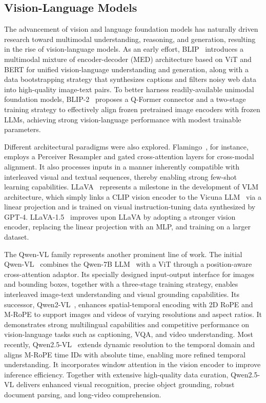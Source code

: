 \documentclass[10pt, a4paper, logo, copyright]{googledeepmind} %
\begin{document}
\subsection{Vision-Language Models}
\label{sec:vlms}

The advancement of vision and language foundation models has naturally driven research toward multimodal understanding, reasoning, and generation, resulting in the rise of vision-language models. As an early effort, BLIP~\cite{li2022blip} introduces a multimodal mixture of encoder-decoder (MED) architecture based on ViT and BERT for unified vision-language understanding and generation, along with a data bootstrapping strategy that synthesizes captions and filters noisy web data into high-quality image-text pairs. To better harness readily-available unimodal foundation models, BLIP-2~\cite{li2023blip} proposes a Q-Former connector and a two-stage training strategy to effectively align frozen pretrained image encoders with frozen LLMs, achieving strong vision-language performance with modest trainable parameters.

Different architectural paradigms were also explored. Flamingo~\cite{alayrac2022flamingo}, for instance, employs a Perceiver Resampler and gated cross-attention layers for cross-modal alignment. It also processes inputs in a manner inherently compatible with interleaved visual and textual sequences, thereby enabling strong few-shot learning capabilities. LLaVA~\cite{liu2023visual} represents a milestone in the development of VLM architecture, which simply links a CLIP vision encoder to the Vicuna LLM~\cite{chiang2023vicuna} via a linear projection and is trained on visual instruction-tuning data synthesized by GPT-4. LLaVA-1.5~\cite{liu2024improved} improves upon LLaVA by adopting a stronger vision encoder, replacing the linear projection with an MLP, and training on a larger dataset.

The Qwen-VL family represents another prominent line of work. The initial Qwen-VL~\cite{bai2023qwenvlversatilevisionlanguagemodel} combines the Qwen-7B LLM~\cite{qwen} with a ViT through a position-aware cross-attention adaptor. Its specially designed input-output interface for images and bounding boxes, together with a three-stage training strategy, enables interleaved image-text understanding and visual grounding capabilities. Its successor, Qwen2-VL~\cite{wang2024qwen2}, enhances spatial-temporal encoding with 2D RoPE and M-RoPE to support images and videos of varying resolutions and aspect ratios. It demonstrates strong multilingual capabilities and competitive performance on vision-language tasks such as captioning, VQA, and video understanding. Most recently, Qwen2.5-VL~\cite{bai2025qwen2} extends dynamic resolution to the temporal domain and aligns M-RoPE time IDs with absolute time, enabling more refined temporal understanding. It incorporates window attention in the vision encoder to improve inference efficiency. Together with extensive high-quality data curation, Qwen2.5-VL delivers enhanced visual recognition, precise object grounding, robust document parsing, and long-video comprehension.
\end{document}
